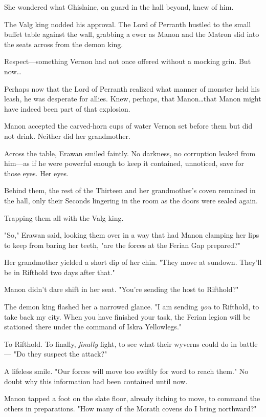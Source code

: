 She wondered what Ghislaine, on guard in the hall beyond, knew of him.

The Valg king nodded his approval.
The Lord of Perranth hustled to the small buffet table against the wall, grabbing a ewer as Manon and the Matron slid into the seats across from the demon king.

Respect---something Vernon had not once offered without a mocking grin.
But now\ldots{}

Perhaps now that the Lord of Perranth realized what manner of monster held his leash, he was desperate for allies.
Knew, perhaps, that Manon\ldots that Manon might have indeed been part of that explosion.

Manon accepted the carved-horn cups of water Vernon set before them but did not drink.
Neither did her grandmother.

Across the table, Erawan smiled faintly.
No darkness, no corruption leaked from him---as if he were powerful enough to keep it contained, unnoticed, save for those eyes.
Her eyes.

Behind them, the rest of the Thirteen and her grandmother's coven remained in the hall, only their Seconds lingering in the room as the doors were sealed again.

Trapping them all with the Valg king.

"So," Erawan said, looking them over in a way that had Manon clamping her lips to keep from baring her teeth, "are the forces at the Ferian Gap prepared?"

Her grandmother yielded a short dip of her chin.
"They move at sundown.
They'll be in Rifthold two days after that."

Manon didn't dare shift in her seat.
"You're sending the host to Rifthold?"

The demon king flashed her a narrowed glance.
"I am sending \emph{you}
to Rifthold, to take back my city.
When you have finished your task, the Ferian legion will be stationed there under the command of Iskra Yellowlegs."

To Rifthold.
To finally, \emph{finally} fight, to see what their wyverns could do in battle--- "Do they suspect the attack?"

A lifeless smile.
"Our forces will move too swiftly for word to reach them."
No doubt why this information had been contained until now.

Manon tapped a foot on the slate floor, already itching to move, to command the others in preparations.
"How many of the Morath covens do I bring northward?"


